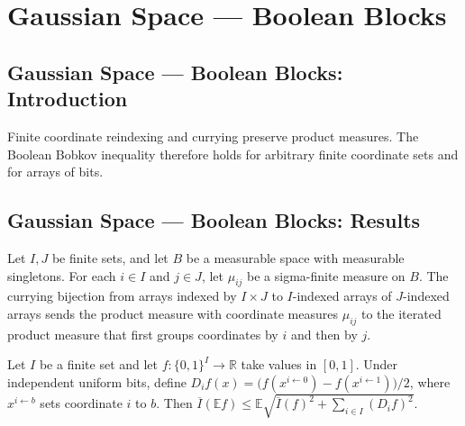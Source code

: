 \section{Gaussian Space --- Boolean Blocks}
\subsection*{Gaussian Space --- Boolean Blocks: Introduction}
Finite coordinate reindexing and currying preserve product measures. The Boolean Bobkov inequality therefore holds for arbitrary finite coordinate sets and for arrays of bits.

\subsection*{Gaussian Space --- Boolean Blocks: Results}

\begin{lemma}
\leanok
{}
Let $I,J$ be finite sets, and let $B$ be a measurable space with measurable singletons.
For each $i\in I$ and $j\in J$, let $\mu_{ij}$ be a sigma-finite measure on $B$. The
currying bijection from arrays indexed by $I\times J$ to $I$-indexed arrays of
$J$-indexed arrays sends the product measure with coordinate measures $\mu_{ij}$ to the
iterated product measure that first groups coordinates by $i$ and then by $j$.
\end{lemma}

\begin{lemma}
\leanok
{}
Let $I$ be a finite set and let $f:\{0,1\}^I\to\mathbb R$ take values in $[0,1]$. Under
independent uniform bits, define $D_i
f(x)=\bigl(f(x^{i\leftarrow0})-f(x^{i\leftarrow1})\bigr)/2$, where $x^{i\leftarrow b}$
sets coordinate $i$ to $b$. Then $\overline I(\mathbb E f)\le\mathbb E\sqrt{\overline
I(f)^2+\sum_{i\in I}(D_i f)^2}$.
\end{lemma}

